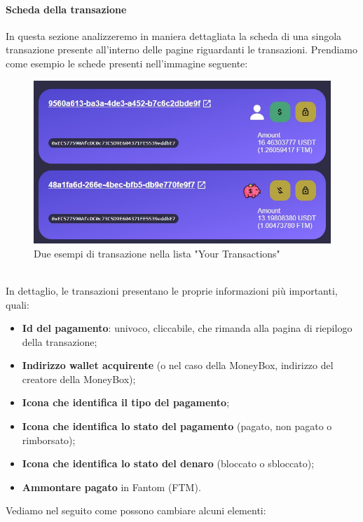         \paragraph{Scheda della transazione}
        In questa sezione analizzeremo in maniera dettagliata la scheda di una singola transazione presente all'interno delle pagine riguardanti le transazioni.
        Prendiamo come esempio le schede presenti nell'immagine seguente:
        \begin{figure}[H]
            \centering
            \includegraphics[scale=0.4]{immagini/Transaction/transactionsmall.jpg}
            \caption{Due esempi di transazione nella lista "Your Transactions"}
        \end{figure}
        \textbf{}\\
        In dettaglio, le transazioni presentano le proprie informazioni più importanti, quali:
        \begin{itemize}
            \item \textbf{Id del pagamento}: univoco, cliccabile, che rimanda alla pagina di riepilogo della transazione;
            \item \textbf{Indirizzo wallet acquirente} (o nel caso della MoneyBox, indirizzo del creatore della MoneyBox);
            \item \textbf{Icona che identifica il tipo del pagamento};
            \item \textbf{Icona che identifica lo stato del pagamento} (pagato, non pagato o rimborsato);
            \item \textbf{Icona che identifica lo stato del denaro} (bloccato o sbloccato);
            \item \textbf{Ammontare pagato} in Fantom\glo{} (FTM\glo{}).
        \end{itemize}
        Vediamo nel seguito come possono cambiare alcuni elementi:
